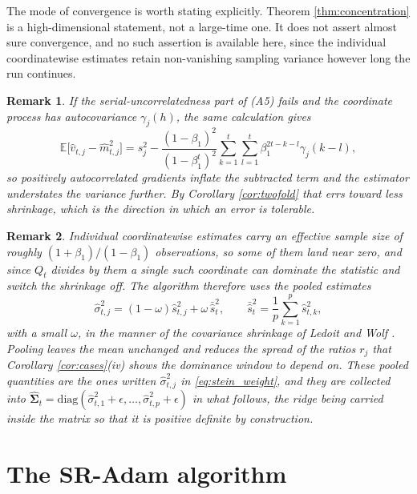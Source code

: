\documentclass[pdflatex,sn-mathphys-num]{sn-jnl}%
\theoremstyle{thmstyleone}%
\theoremstyle{thmstyletwo}%
\newtheorem{remark}{Remark}%
\theoremstyle{thmstylethree}%
\newcommand{\diag}{\mathrm{diag}}
\newcommand{\E}{\mathbb{E}}
\begin{document}
The mode of convergence is worth stating explicitly. Theorem \ref{thm:concentration} is a high-dimensional statement, not a large-time one. It does not assert almost sure convergence, and no such assertion is available here, since the individual coordinatewise estimates retain non-vanishing sampling variance however long the run continues.

\begin{remark}
\label{rem:a5}
If the serial-uncorrelatedness part of (A5) fails and the coordinate process has autocovariance $\gamma_j(h)$, the same calculation gives
\begin{equation}
\E\bigl[\hat v_{t,j}-\hat m^2_{t,j}\bigr]
=
s^2_j-\frac{(1-\beta_1)^2}{(1-\beta_1^{t})^{2}}\sum_{k=1}^{t}\sum_{l=1}^{t}\beta_1^{2t-k-l}\gamma_j(k-l),
\end{equation}
so positively autocorrelated gradients inflate the subtracted term and the estimator understates the variance further. By Corollary \ref{cor:twofold} that errs toward less shrinkage, which is the direction in which an error is tolerable.
\end{remark}

\begin{remark}
\label{rem:pooling}
Individual coordinatewise estimates carry an effective sample size of roughly $(1+\beta_1)/(1-\beta_1)$ observations, so some of them land near zero, and since $Q_t$ divides by them a single such coordinate can dominate the statistic and switch the shrinkage off. The algorithm therefore uses the pooled estimates
\begin{equation}
\label{eq:pooled}
\hat\sigma^2_{t,j}=(1-\omega)\hat s^2_{t,j}+\omega\,\bar{\hat s}^2_t,
\qquad
\bar{\hat s}^2_t=\frac1p\sum_{k=1}^{p}\hat s^2_{t,k},
\end{equation}
with a small $\omega$, in the manner of the covariance shrinkage of Ledoit and Wolf \cite{ledoit2004}. Pooling leaves the mean unchanged and reduces the spread of the ratios $r_j$ that Corollary \ref{cor:cases}(iv) shows the dominance window to depend on. These pooled quantities are the ones written $\hat\sigma^2_{t,j}$ in \eqref{eq:stein_weight}, and they are collected into $\widehat{\bm\Sigma}_t=\diag(\hat\sigma^2_{t,1}+\epsilon,\dots,\hat\sigma^2_{t,p}+\epsilon)$ in what follows, the ridge being carried inside the matrix so that it is positive definite by construction.
\end{remark}

\section{The SR-Adam algorithm}
\label{sec:algorithm}
\end{document}
